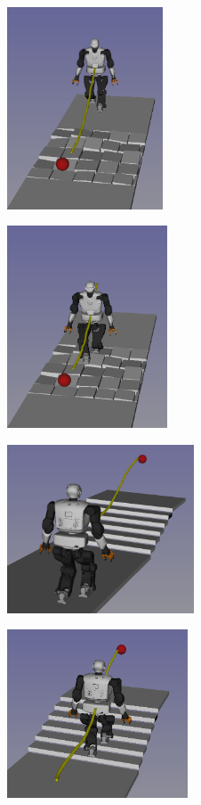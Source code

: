 \begin{figure}[H]
    \captionsetup[subfigure]{justification=centering}
    \centering
    \begin{subfigure}[t]{0.45\linewidth}
        \includegraphics[width=\textwidth, height=6cm]{Figures/Chapter_CPSB/rubbles_0.png}
    \end{subfigure}
    \begin{subfigure}[t]{0.45\linewidth}
        \includegraphics[width=\textwidth, height=6cm]{Figures/Chapter_CPSB/rubbles_1.png}
    \end{subfigure}
    \begin{subfigure}[t]{0.45\linewidth}
        \includegraphics[width=\textwidth, height=5cm]{Figures/Chapter_CPSB/stairs_diago.png}
    \end{subfigure}
    \begin{subfigure}[t]{0.45\linewidth}
        \includegraphics[width=\textwidth, height=5cm]{Figures/Chapter_CPSB/stairs_diago1.png}

\end{subfigure}
\end{figure}
